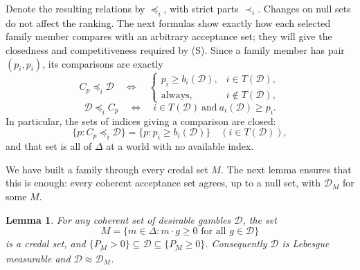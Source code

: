 \documentclass[11pt]{article}
\newtheorem{lemma}[theorem]{Lemma}
\theoremstyle{remark}
\newcommand{\Dscr}{\mathcal D}
\newcommand{\lpr}[1]{\underline{P_{#1}}}
\begin{document}
Denote the resulting relations by $\preceq_i$, with strict parts $\prec_i$.
Changes on null sets do not affect the ranking. The next formulas show exactly
how each selected family member compares with an arbitrary acceptance set;
they will give the closedness and competitiveness required by (S).
Since a family member has pair $(p_i,p_i)$, its comparisons are exactly
\begin{equation}
 C_{p}\preceq_i\Dscr\quad\Longleftrightarrow\quad
 \begin{cases}p_i\ge b_i(\Dscr),&i\in T(\Dscr),\\
 \text{always},&i\notin T(\Dscr),\end{cases}\label{eq:outgoing}
\end{equation}
\begin{equation}
 \Dscr\preceq_iC_{p}\quad\Longleftrightarrow\quad
 i\in T(\Dscr)\ \text{and}\ a_i(\Dscr)\ge p_i.\label{eq:incoming}
\end{equation}
In particular, the sets of indices giving a comparison are closed:
\begin{equation}
 \{p:C_{p}\preceq_i\Dscr\}=\{p:p_i\ge b_i(\Dscr)\}\quad(i\in T(\Dscr)),\label{eq:sections}
\end{equation}
and that set is all of $\Delta$ at a world with no available index.

We have built a family through every credal set $M$. The next lemma ensures
that this is enough: every coherent acceptance set agrees, up to a null set,
with $\Dscr_M$ for some $M$.
\begin{lemma}\label{lem:coherent}
For any coherent set of desirable gambles $\Dscr$, the set
\[
 M=\{m\in\Delta:m\cdot g\ge0\text{ for all }g\in \Dscr\}
\]
is a credal set, and
$\{\lpr{M}>0\}\subseteq \Dscr\subseteq\{\lpr{M}\ge0\}$.
Consequently $\Dscr$ is Lebesgue measurable and $\Dscr\approx \Dscr_{M}$.
\end{lemma}
\end{document}
